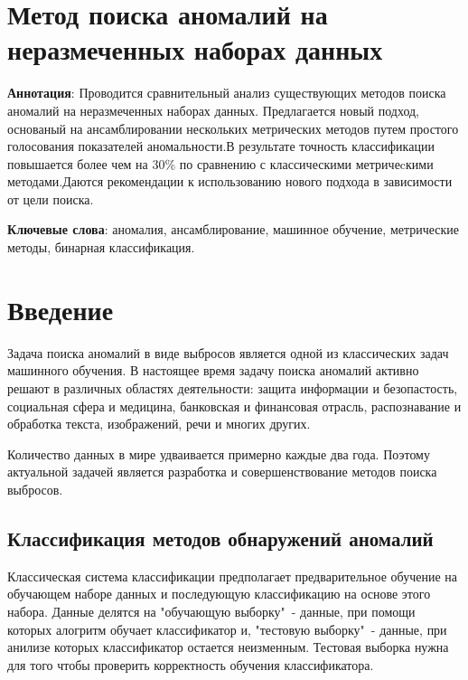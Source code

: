 \section*{Метод поиска аномалий на неразмеченных наборах данных}
\label{cha:analysis}
\textbf{Аннотация}: Проводится сравнительный анализ существующих методов поиска аномалий на неразмеченных наборах данных. Предлагается новый подход, основаный на ансамблировании нескольких метрических методов путем простого голосования показателей аномальности.В результате точность классификации повышается более чем на 30\% по сравнению с классическими метричеcкими методами.Даются рекомендации к использованию нового подхода в зависимости от цели поиска.
 
\textbf{Ключевые слова}: аномалия, ансамблирование, машинное обучение, метрические методы, бинарная классификация. 
\section{Введение} 
Задача поиска аномалий в виде выбросов является одной из классических задач машинного обучения. В настоящее время задачу поиска аномалий активно решают в различных областях деятельности: защита информации и безопастость, социальная сфера и медицина, банковская и финансовая отрасль, распознавание и обработка текста, изображений, речи и многих других.

Количество данных в мире удваивается примерно каждые два года. Поэтому актуальной задачей является разработка и совершенствование методов поиска выбросов.

\subsection{Классификация методов обнаружений аномалий}
Классическая система классификации предполагает предварительное обучение на обучающем наборе данных и последующую классификацию на основе этого набора. Данные делятся на "обучающую выборку"\ - данные, при помощи которых алогритм обучает классификатор и, "тестовую выборку"\ - данные, при анилизе которых классификатор остается неизменным. Тестовая выборка нужна для того чтобы проверить корректность обучения классификатора.

